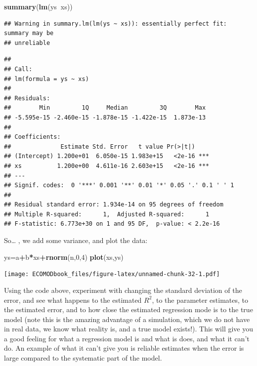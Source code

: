 \documentclass[
]{book}
\newenvironment{Shaded}{\begin{snugshade}}{\end{snugshade}}
\newcommand{\DecValTok}[1]{\textcolor[rgb]{0.00,0.00,0.81}{#1}}
\newcommand{\KeywordTok}[1]{\textcolor[rgb]{0.13,0.29,0.53}{\textbf{#1}}}
\newcommand{\NormalTok}[1]{#1}
\newcommand{\OperatorTok}[1]{\textcolor[rgb]{0.81,0.36,0.00}{\textbf{#1}}}
\begin{document}
\begin{Shaded}
\begin{Highlighting}[]
\KeywordTok{summary}\NormalTok{(}\KeywordTok{lm}\NormalTok{(ys}\OperatorTok{~}\NormalTok{xs))}
\end{Highlighting}
\end{Shaded}

\begin{verbatim}
## Warning in summary.lm(lm(ys ~ xs)): essentially perfect fit: summary may be
## unreliable
\end{verbatim}

\begin{verbatim}
## 
## Call:
## lm(formula = ys ~ xs)
## 
## Residuals:
##        Min         1Q     Median         3Q        Max 
## -5.595e-15 -2.460e-15 -1.878e-15 -1.422e-15  1.873e-13 
## 
## Coefficients:
##              Estimate Std. Error   t value Pr(>|t|)    
## (Intercept) 1.200e+01  6.050e-15 1.983e+15   <2e-16 ***
## xs          1.200e+00  4.611e-16 2.603e+15   <2e-16 ***
## ---
## Signif. codes:  0 '***' 0.001 '**' 0.01 '*' 0.05 '.' 0.1 ' ' 1
## 
## Residual standard error: 1.934e-14 on 95 degrees of freedom
## Multiple R-squared:      1,	Adjusted R-squared:      1 
## F-statistic: 6.773e+30 on 1 and 95 DF,  p-value: < 2.2e-16
\end{verbatim}

So\ldots{} , we add some variance, and plot the data:

\begin{Shaded}
\begin{Highlighting}[]
\NormalTok{ys=a}\OperatorTok{+}\NormalTok{b}\OperatorTok{*}\NormalTok{xs}\OperatorTok{+}\KeywordTok{rnorm}\NormalTok{(n,}\DecValTok{0}\NormalTok{,}\DecValTok{4}\NormalTok{)}
\KeywordTok{plot}\NormalTok{(xs,ys)}
\end{Highlighting}
\end{Shaded}

\texttt{[image: ECOMODbook\_files/figure-latex/unnamed-chunk-32-1.pdf]}

Using the code above, experiment with changing the standard deviation of the error, and see what happens to the estimated \(R^2\), to the parameter estimates, to the estimated error, and to how close the estimated regression mode is to the true model (note this is the amazing advantage of a simulation, which we do not have in real data, we know what reality is, and a true model exists!). This will give you a good feeling for what a regression model is and what is does, and what it can't do. An example of what it can't give you is reliable estimates when the error is large compared to the systematic part of the model.
\end{document}
